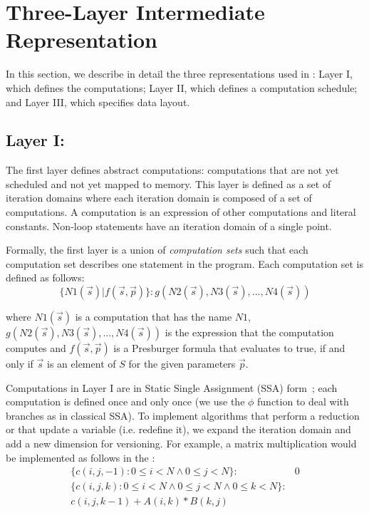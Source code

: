 \section{\label{sec:ir}Three-Layer Intermediate Representation}
In this section, we describe in detail the three representations used in \framework{}: Layer I, which defines the computations; Layer II, which defines a computation schedule; and Layer III, which specifies data layout.

\subsection{Layer I: \Layerone}
\label{layer1}

The first layer defines abstract computations: computations that are not yet scheduled and not yet mapped to memory.  This layer is defined as a set of iteration domains where each iteration domain is composed of a set of computations.  A computation is an expression of other computations and literal constants.  Non-loop statements have an iteration domain of a single point.

Formally, the first layer is a union of \emph{computation sets} such that each computation set describes one statement in the program. Each computation set is defined as follows:
$$\{N1(\vec{s}) | f(\vec{s}, \vec{p})\} : g(N2(\vec{s}), N3(\vec{s}), ..., N4(\vec{s}))$$

\noindent where $N1(\vec{s})$ is a computation that has the name $N1$, $g(N2(\vec{s}), N3(\vec{s}), ..., N4(\vec{s}))$ is the expression that the computation computes and $f(\vec{s}, \vec{p})$ is a Presburger formula that evaluates to true, if and only if $\vec{s}$ is an element of $S$ for the given parameters $\vec{p}$.

Computations in Layer I are in Static Single Assignment (SSA) form~\cite{Cytron:1991:ECS:115372.115320}; each computation is defined once and only once (we use the $\phi$ function to deal with branches as in classical SSA).  To implement algorithms that perform a reduction or that update a variable (i.e. redefine it), we expand the iteration domain and add a new dimension for versioning.  For example, a matrix multiplication would be implemented as follows in the \layerone:
\begin{align*}
\{c(i,j,-1):  0\leq i < N \wedge 0\leq j < N \}: & 0 \\
\{c(i,j,k): 0\leq i < N \wedge 0\leq j < N \wedge 0 \leq k < N \}: & \\
 c(i,j,k-1) + A(i,k) * B(k,j) &
\end{align*}

